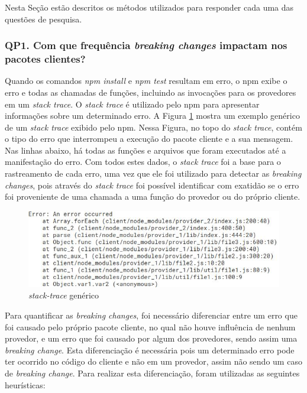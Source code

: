 Nesta Seção estão descritos os métodos utilizados para responder cada uma das questões de pesquisa.

\subsubsection{QP1. Com que frequência \textit{breaking changes} impactam nos pacotes clientes?}
\label{apr:rq1}

Quando os comandos \textit{npm install} e \textit{npm test} resultam em erro, o \gls{npm} exibe o erro e todas as chamadas de funções, incluindo as invocações para os provedores em um \textit{stack trace}. O \textit{stack trace} é utilizado pelo \gls{npm} para apresentar informações sobre um determinado erro. A Figura \ref{fig:trace} mostra um exemplo genérico de um \textit{stack trace} exibido pelo \gls{npm}. Nessa Figura, no topo do \textit{stack trace}, contém o tipo do erro que interrompeu a execução do pacote cliente e a sua mensagem. Nas linhas abaixo, há todas as funções e arquivos que foram executados até a manifestação do erro. Com todos estes dados, o \textit{stack trace} foi a base para o rastreamento de cada erro, uma vez que ele foi utilizado para detectar as \textit{breaking changes}, pois através do \textit{stack trace} foi possível identificar com exatidão se o erro foi proveniente de uma chamada a uma função do provedor ou do próprio cliente.

\begin{figure}
    \centering
    \includegraphics[scale=0.7]{figuras/stack_trace.jpeg}
    \caption{\textit{stack-trace} genérico}
    \label{fig:trace}
\end{figure}{}

Para quantificar as \textit{breaking changes}, foi necessário diferenciar entre um erro que foi causado pelo próprio pacote cliente, no qual não houve influência de nenhum provedor, e um erro que foi causado por algum dos provedores, sendo assim uma \textit{breaking change}. Esta diferenciação é necessária pois um determinado erro pode ter ocorrido no código do cliente e não em um provedor, assim não sendo um caso de \textit{breaking change}. Para realizar esta diferenciação, foram utilizadas as seguintes heurísticas:


